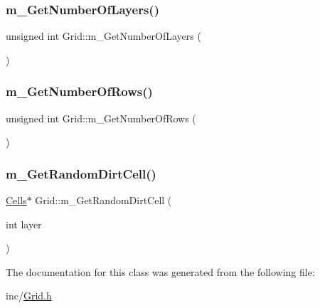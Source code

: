 \subsubsection{\texorpdfstring{m\+\_\+\+Get\+Number\+Of\+Layers()}{m\_GetNumberOfLayers()}}
{\footnotesize\ttfamily unsigned int Grid\+::m\+\_\+\+Get\+Number\+Of\+Layers (\begin{DoxyParamCaption}{ }\end{DoxyParamCaption})}

\mbox{\label{class_grid_aa14c1738133d778e8b2484afda051117}} 
\subsubsection{\texorpdfstring{m\+\_\+\+Get\+Number\+Of\+Rows()}{m\_GetNumberOfRows()}}
{\footnotesize\ttfamily unsigned int Grid\+::m\+\_\+\+Get\+Number\+Of\+Rows (\begin{DoxyParamCaption}{ }\end{DoxyParamCaption})}

\mbox{\label{class_grid_a7464f3bbe32feea62b940522e686fa3b}} 
\subsubsection{\texorpdfstring{m\+\_\+\+Get\+Random\+Dirt\+Cell()}{m\_GetRandomDirtCell()}}
{\footnotesize\ttfamily \mbox{\hyperlink{class_cells}{Cells}}$\ast$ Grid\+::m\+\_\+\+Get\+Random\+Dirt\+Cell (\begin{DoxyParamCaption}\item[{int}]{layer }\end{DoxyParamCaption})}



The documentation for this class was generated from the following file\+:\begin{DoxyCompactItemize}
\item 
inc/\mbox{\hyperlink{_grid_8h}{Grid.\+h}}\end{DoxyCompactItemize}
